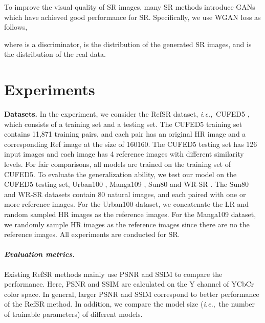 \documentclass[runningheads]{llncs}
\def\ie{\mbox{\textit{i.e.}, }}
\begin{document}
To improve the visual quality of SR images, many SR methods \cite{ledig2017photo,wang2018esrgan} introduce GANs \cite{goodfellow2014GAN,arjovsky2017wasserstein} which have achieved good performance for SR.
Specifically, we use WGAN \cite{arjovsky2017wasserstein} loss as follows,

where  is a discriminator,  is the distribution of the generated SR images, and  is the distribution of the real data.



\section{Experiments}

\noindent\textbf{Datasets.}
In the experiment, we consider the RefSR dataset, \ie CUFED5 \cite{zhang2019image}, which consists of a training set and a testing set.
The CUFED5 training set contains 11,871 training pairs, and each pair has an original HR image and a corresponding Ref image at the size of 160160. 
The CUFED5 testing set has 126 input images and each image has 4 reference images with different similarity levels.
For fair comparisons, all models are trained on the training set of CUFED5. 
To evaluate the generalization ability, we test our model on the CUFED5 testing set, Urban100 \cite{huang2015single}, Manga109 \cite{matsui2017sketch}, Sun80 \cite{sun2012super} and WR-SR \cite{jiang2021robust}.
The Sun80 and WR-SR datasets contain 80 natural images, and each paired with one or more reference images.  
For the Urban100 dataset, we concatenate the LR and random sampled HR images as the reference images.
For the Manga109 dataset, we randomly sample HR images as the reference images since there are no the reference images. 
All experiments are conducted for  SR.

\paragraph{\textbf{\emph{Evaluation metrics.}}}
Existing RefSR methods \cite{yang2020learning,jiang2021robust,yang2020learning} mainly use PSNR and SSIM to compare the performance.
Here, PSNR and SSIM are calculated on the Y channel of YCbCr color space.
In general, larger PSNR and SSIM correspond to better performance of the RefSR method.
In addition, we compare the model size (\ie the number of trainable parameters) of different models.
\end{document}
